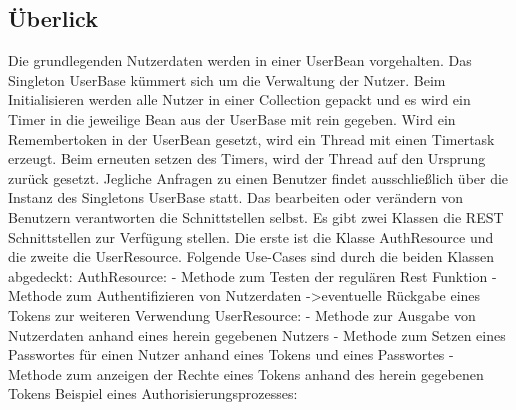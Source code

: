 \documentclass[german]{book}
\begin{document}
\subsection{Überlick} 
Die grundlegenden Nutzerdaten werden in einer UserBean vorgehalten. Das Singleton UserBase kümmert sich um die Verwaltung der Nutzer. Beim Initialisieren werden alle Nutzer in einer Collection gepackt und es wird ein Timer in die jeweilige Bean aus der UserBase mit rein gegeben.  Wird ein Remembertoken in der UserBean gesetzt, wird ein Thread mit einen Timertask erzeugt. Beim erneuten setzen des Timers, wird der Thread auf den Ursprung zurück gesetzt. Jegliche Anfragen zu einen Benutzer findet ausschließlich über die Instanz des Singletons UserBase statt. Das bearbeiten oder verändern von Benutzern verantworten die Schnittstellen selbst. 
\newline
\newline
Es gibt zwei Klassen die REST Schnittstellen zur Verfügung stellen. Die erste ist die Klasse AuthResource und die zweite die UserResource. Folgende Use-Cases sind durch die beiden Klassen abgedeckt:
\newline
\newline
AuthResource:
\newline
- Methode zum Testen der regulären Rest Funktion
\newline
- Methode zum Authentifizieren von Nutzerdaten ->eventuelle Rückgabe eines Tokens zur weiteren Verwendung
\newline
\newline
UserResource:
\newline
- Methode zur Ausgabe von Nutzerdaten anhand eines herein gegebenen Nutzers
\newline
- Methode zum Setzen eines Passwortes für einen Nutzer anhand eines Tokens und eines Passwortes
\newline
- Methode zum anzeigen der Rechte eines Tokens anhand des herein gegebenen Tokens
\newline
\newline
\newpage
Beispiel eines Authorisierungsprozesses: 
\newline
\newline
\end{document}

